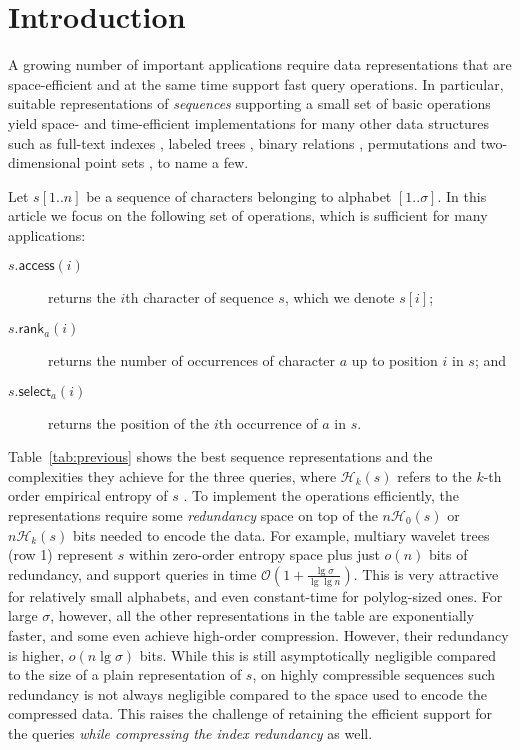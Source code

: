 \documentclass[11pt]{article}
\newcommand{\Oh}[1]
    {\ensuremath{\mathcal{O}\left( {#1} \right)}}
\newcommand{\access}
    {\ensuremath{\mathsf{access}}}
\newcommand{\rank}
    {\ensuremath{\mathsf{rank}}}
\newcommand{\select}
    {\ensuremath{\mathsf{select}}}
\newcommand{\HH}{\mathcal{H}}
\newcommand{\Ho}{\HH_0}
\newcommand{\Hk}{\HH_k}
\begin{document}
\section{Introduction} \label{sec:introduction}

A growing number of important applications require data
representations that are space-efficient and at the same time support
fast query operations.  In particular, suitable representations of
{\em sequences} supporting a small set of basic operations yield
space- and time-efficient implementations for many other data
structures such as full-text indexes \cite{GGV03,GMR06,FMMN07,NM07},
labeled trees \cite{BHMR07,BGMR07,FLMM09}, binary relations
\cite{BHMR07,BCN10}, permutations \cite{BN09} and two-dimensional
point sets \cite{MN07,BLNS09}, to name a few.

Let $s[1..n]$ be a sequence of characters belonging to alphabet
$[1..\sigma]$.  In this article we focus on the following set of
operations, which is sufficient for many applications:
\begin{description}
\item[\(s.\access (i)\)] returns the $i$th character of sequence $s$,
  which we denote \(s [i]\);
\item[\(s.\rank_a (i)\)] returns the number of occurrences of
  character $a$ up to position $i$ in $s$; and
\item[\(s.\select_a (i)\)] returns the position of the $i$th
  occurrence of $a$ in $s$.
\end{description}

Table~\ref{tab:previous} shows the best sequence representations and
the complexities they achieve for the three queries, where $\Hk(s)$
refers to the $k$-th order empirical entropy of $s$ \cite{Man01}. To
implement the operations efficiently, the representations require some
{\em redundancy} space on top of the $n\Ho(s)$ or $n\Hk(s)$ bits
needed to encode the data.
For example, multiary wavelet trees (row 1) represent $s$ within
zero-order entropy space plus just $o(n)$ bits of redundancy, and
support queries in time $\Oh{1+\frac{\lg\sigma}{\lg\lg n}}$. This is
very attractive for relatively small alphabets, and even constant-time
for polylog-sized ones. For large $\sigma$, however, all the other
representations in the table are exponentially faster, and some even
achieve high-order compression. However, their redundancy is higher,
$o(n\lg\sigma)$ bits. While this is still asymptotically negligible
compared to the size of a plain representation of $s$, on highly
compressible sequences such redundancy is not always negligible
compared to the space used to encode the compressed data. This raises
the challenge of retaining the efficient support for the queries {\em
  while compressing the index redundancy} as well.
\end{document}

